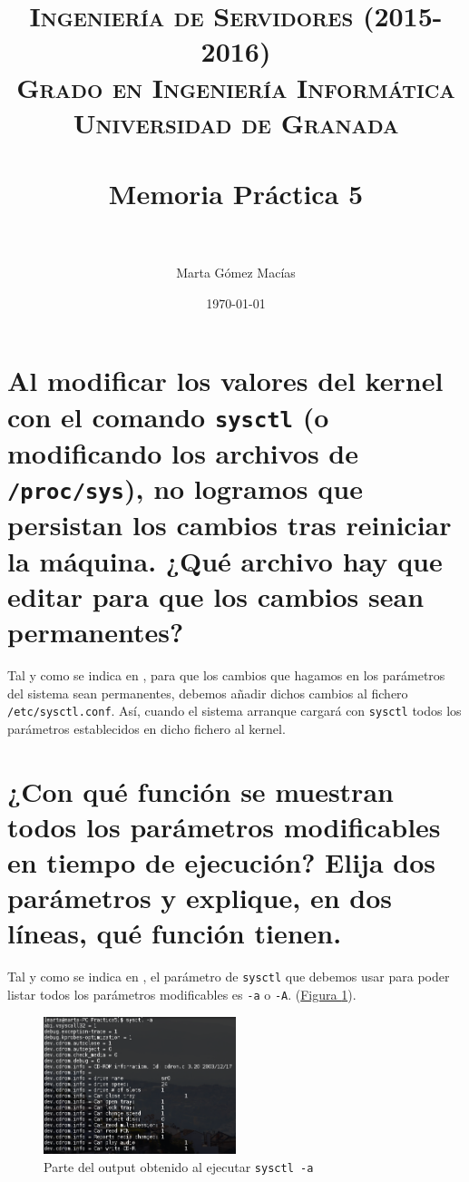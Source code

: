 \documentclass[10pt,a4paper,spanish]{article}
\title{
\normalfont \normalsize 
\textsc{{\bf Ingeniería de Servidores (2015-2016)} \\ Grado en Ingeniería Informática \\ Universidad de Granada} \\ [25pt] %
\horrule{0.5pt} \\[0.4cm] %
\huge Memoria Práctica 5 \\ %
\horrule{2pt} \\[0.5cm] %
}
\author{Marta Gómez Macías} %
\date{\normalsize\today} %
\numberwithin{equation}{section} %
\numberwithin{figure}{section} %
\numberwithin{table}{section} %
\begin{document}
\renewcommand{\listtablename}{Índice de tablas}

\maketitle %

\newpage %

\tableofcontents %

\listoffigures


\newpage

\section{Al modificar los valores del kernel con el comando \texttt{sysctl} (o modificando los archivos de \texttt{/proc/sys}), no logramos que persistan los cambios tras reiniciar la máquina. ¿Qué archivo hay que editar para que los cambios sean permanentes?}
Tal y como se indica en \cite{sysctlredhat}, para que los cambios que hagamos en los parámetros del sistema sean permanentes, debemos añadir dichos cambios al fichero \texttt{/etc/sysctl.conf}. Así, cuando el sistema arranque cargará con \texttt{sysctl} todos los parámetros establecidos en dicho fichero al kernel.

\section{¿Con qué función se muestran todos los parámetros modificables en tiempo de ejecución? Elija dos parámetros y explique, en dos líneas, qué función tienen.}
Tal y como se indica en \cite{sysctlman}, el parámetro de \texttt{sysctl} que debemos usar para poder listar todos los parámetros modificables es \texttt{-a} o \texttt{-A}. (\hyperref[sysctla]{Figura \ref*{sysctla}}).

\begin{figure}[!h]
    \centering
    \includegraphics[width=0.5\textwidth]{1}
    \caption{Parte del output obtenido al ejecutar \texttt{sysctl -a}}
    \label{sysctla}
\end{figure}
\end{document}
